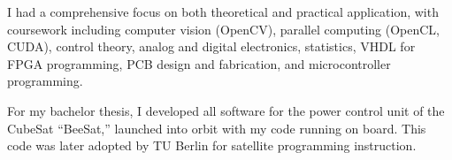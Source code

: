 \documentclass[8pt]{mofiicv}
\begin{document}
\begin{minipage}[T]{\SecondColumnWidth}
\begin{entrylist}
{			I had a comprehensive focus on both theoretical and practical application, with coursework including computer vision (OpenCV), parallel computing (OpenCL, CUDA), control theory, analog and digital electronics, statistics, VHDL for FPGA programming, PCB design and fabrication, and microcontroller programming.

			For my bachelor thesis, I developed all software for the power control unit of the CubeSat “BeeSat,” launched into orbit with my code running on board. This code was later adopted by TU Berlin for satellite programming instruction.}
	\end{entrylist}
	\end{minipage}
	
\end{document}

